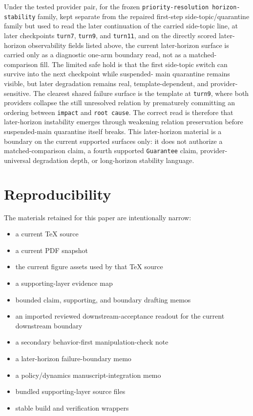 \documentclass[11pt]{article}
\renewcommand{\_}{\textunderscore\hspace{0pt}}
\renewenvironment{quote}
  {\list{}{\leftmargin1em\rightmargin1em}\item\relax\small\sloppy}
  {\endlist}
\newcommand{\code}[1]{\path{#1}}
\begin{document}
\begin{quote}
Under the tested provider pair, for the frozen
\texttt{priority-resolution horizon-stability} family, kept separate from the
repaired first-step side-topic/quarantine family but used to read the later
continuation of the carried side-topic line, at later checkpoints
\texttt{turn7}, \texttt{turn9}, and \texttt{turn11}, and on the directly scored
later-horizon observability fields listed above, the
current later-horizon surface is carried only as a diagnostic one-arm boundary
read, not as a matched-comparison fill. The limited safe hold is that the
first side-topic switch can survive into the next checkpoint while suspended-
main quarantine remains visible, but later degradation remains real,
template-dependent, and provider-sensitive. The clearest shared failure surface
is the \code{C_incident_response} template at \texttt{turn9}, where both providers
collapse the still unresolved relation by prematurely committing an ordering
between \texttt{impact} and \texttt{root cause}. The correct read is therefore
that later-horizon instability emerges through weakening relation preservation
before suspended-main quarantine itself breaks. This later-horizon material is
a boundary on the current supported surfaces only: it does not authorize a
matched-comparison claim, a fourth supported \texttt{Guarantee} claim,
provider-universal degradation depth, or long-horizon stability language.
\end{quote}

\section{Reproducibility}

The materials retained for this paper are intentionally narrow:
\begin{itemize}
\item a current TeX source
\item a current PDF snapshot
\item the current figure assets used by that TeX source
\item a supporting-layer evidence map
\item bounded claim, supporting, and boundary drafting memos
\item an imported reviewed downstream-acceptance readout for the
current downstream boundary
\item a secondary behavior-first manipulation-check note
\item a later-horizon failure-boundary memo
\item a policy/dynamics manuscript-integration memo
\item bundled supporting-layer source files
\item stable build and verification wrappers
\end{itemize}
\end{document}
